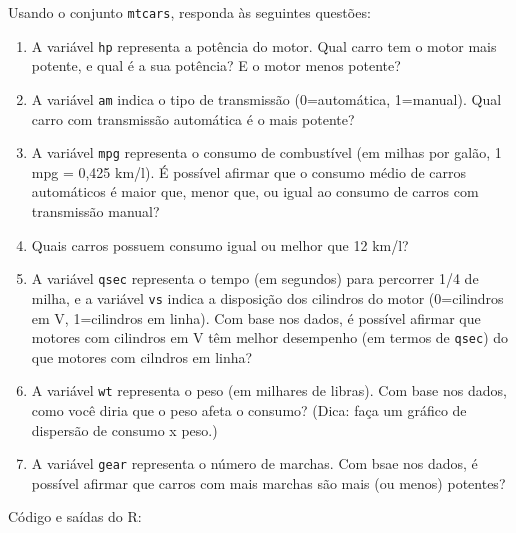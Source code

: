 \documentclass[
]{article}
\providecommand{\tightlist}{%
  \setlength{\itemsep}{0pt}\setlength{\parskip}{0pt}}
\begin{document}
Usando o conjunto \texttt{mtcars}, responda às seguintes questões:

\begin{enumerate}
\def\labelenumi{\arabic{enumi}.}
\tightlist
\item
  A variável \texttt{hp} representa a potência do motor. Qual carro tem
  o motor mais potente, e qual é a sua potência? E o motor menos
  potente?
\item
  A variável \texttt{am} indica o tipo de transmissão (0=automática,
  1=manual). Qual carro com transmissão automática é o mais potente?
\item
  A variável \texttt{mpg} representa o consumo de combustível (em milhas
  por galão, 1 mpg = 0,425 km/l). É possível afirmar que o consumo médio
  de carros automáticos é maior que, menor que, ou igual ao consumo de
  carros com transmissão manual?
\item
  Quais carros possuem consumo igual ou melhor que 12 km/l?
\item
  A variável \texttt{qsec} representa o tempo (em segundos) para
  percorrer 1/4 de milha, e a variável \texttt{vs} indica a disposição
  dos cilindros do motor (0=cilindros em V, 1=cilindros em linha). Com
  base nos dados, é possível afirmar que motores com cilindros em V têm
  melhor desempenho (em termos de \texttt{qsec}) do que motores com
  cilndros em linha?
\item
  A variável \texttt{wt} representa o peso (em milhares de libras). Com
  base nos dados, como você diria que o peso afeta o consumo? (Dica:
  faça um gráfico de dispersão de consumo x peso.)
\item
  A variável \texttt{gear} representa o número de marchas. Com bsae nos
  dados, é possível afirmar que carros com mais marchas são mais (ou
  menos) potentes?
\end{enumerate}

Código e saídas do R:
\end{document}
